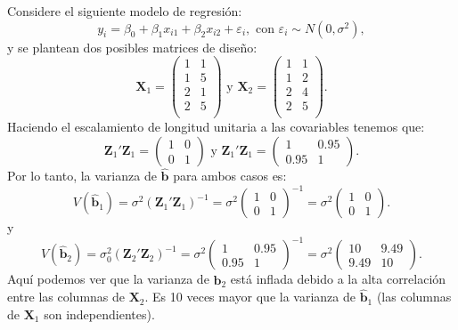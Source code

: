 \documentclass[
]{article}
\begin{document}
Considere el siguiente modelo de regresión:
\[
y_{i} = \beta_{0} + \beta_{1}x_{i1} + \beta_{2}x_{i2} + \varepsilon_{i}, \mbox{ con }\varepsilon_{i}\sim N(0,\sigma^{2}),
\]
y se plantean dos posibles matrices de diseño:
\[
\boldsymbol X_{1} = \begin{pmatrix}
1& 1 \\ 
1 & 5 \\ 
2 & 1 \\ 
2 & 5 \\
\end{pmatrix} \mbox{ y }
\boldsymbol X_{2} = \begin{pmatrix}
1& 1 \\ 
1 & 2 \\ 
2 & 4 \\ 
2 & 5 \\
\end{pmatrix}.
\]
Haciendo el escalamiento de longitud unitaria a las covariables tenemos que:
\[
\boldsymbol Z_{1}'\boldsymbol Z_{1} = \begin{pmatrix}
1 & 0 \\ 0 & 1
\end{pmatrix} \mbox{ y }
\boldsymbol Z_{1}'\boldsymbol Z_{1} = \begin{pmatrix}
1 & 0.95 \\ 0.95 & 1
\end{pmatrix}.
\]
Por lo tanto, la varianza de \(\widehat{\boldsymbol b}\) para ambos casos es:
\[
V(\widehat{\boldsymbol b}_{1}) = \sigma^{2}(\boldsymbol Z_{1}'\boldsymbol Z_{1})^{-1} =  \sigma^{2} \begin{pmatrix}
1 & 0 \\ 0 & 1
\end{pmatrix}^{-1}  = \sigma^{2} \begin{pmatrix}
1 & 0 \\ 0 & 1
\end{pmatrix}.
\]
y
\[
V(\widehat{\boldsymbol b}_{2}) = \sigma^{2}_{0}(\boldsymbol Z_{2}'\boldsymbol Z_{2})^{-1} =  \sigma^{2} \begin{pmatrix}
1 & 0.95 \\ 0.95 & 1
\end{pmatrix}^{-1} = \sigma^{2} \begin{pmatrix}
10 & 9.49 \\ 9.49 & 10
\end{pmatrix}.
\]
Aquí podemos ver que la varianza de \(\widehat{\boldsymbol b}_{2}\) está inflada debido a la alta correlación entre las columnas de \(\boldsymbol X_{2}\). Es 10 veces mayor que la varianza de \(\widehat{\boldsymbol b}_{1}\) (las columnas de \(\boldsymbol X_{1}\) son independientes).
\end{document}
